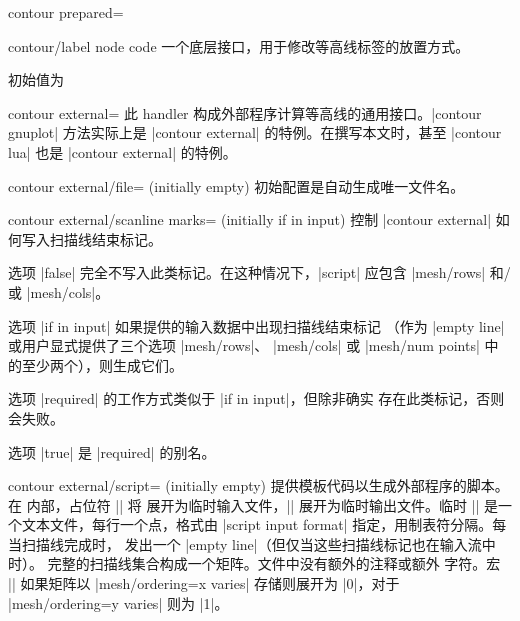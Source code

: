 {{\begin{plottype}[/pgfplots]{contour prepared=\textcolor{black}{}}
    \begin{pgfplotscodekey}{contour/label node code}
        一个底层接口，用于修改等高线标签的放置方式。

        初始值为
\begin{codeexample}
\end{codeexample}
    \end{pgfplotscodekey}
\end{plottype}

\begin{plottype}[/pgfplots]{
    contour external=\textcolor{black}{}%
}
    此 handler 构成外部程序计算等高线的通用接口。|contour gnuplot|
    方法实际上是 |contour external| 的特例。在撰写本文时，甚至
    |contour lua| 也是 |contour external| 的特例。

    \begin{pgfplotskey}{contour external/file= (initially empty)}
        初始配置是自动生成唯一文件名。
    \end{pgfplotskey}

    \begin{pgfplotskey}{contour external/scanline marks= (initially if in input)}
        控制 |contour external| 如何写入扫描线结束标记。

        选项 |false| 完全不写入此类标记。在这种情况下，|script|
        应包含 |mesh/rows| 和/或 |mesh/cols|。

        选项 |if in input| 如果提供的输入数据中出现扫描线结束标记
        （作为 |empty line| 或用户显式提供了三个选项 |mesh/rows|、
        |mesh/cols| 或 |mesh/num points| 中的至少两个），则生成它们。

        选项 |required| 的工作方式类似于 |if in input|，但除非确实
        存在此类标记，否则会失败。

        选项 |true| 是 |required| 的别名。
    \end{pgfplotskey}

    \begin{pgfplotskey}{contour external/script= (initially empty)}
        提供模板代码以生成外部程序的脚本。在
         内部，占位符 |\infile| 将
        展开为临时输入文件，|\outfile| 展开为临时输出文件。临时
        |\infile| 是一个文本文件，每行一个点，格式由
        |script input format| 指定，用制表符分隔。每当扫描线完成时，
        发出一个 |empty line|（但仅当这些扫描线标记也在输入流中时）。
        完整的扫描线集合构成一个矩阵。文件中没有额外的注释或额外
        字符。宏 |\ordering| 如果矩阵以 |mesh/ordering=x varies|
        存储则展开为 |0|，对于 |mesh/ordering=y varies| 则为 |1|。


\end{pgfplotskey}
\end{plottype}}}
